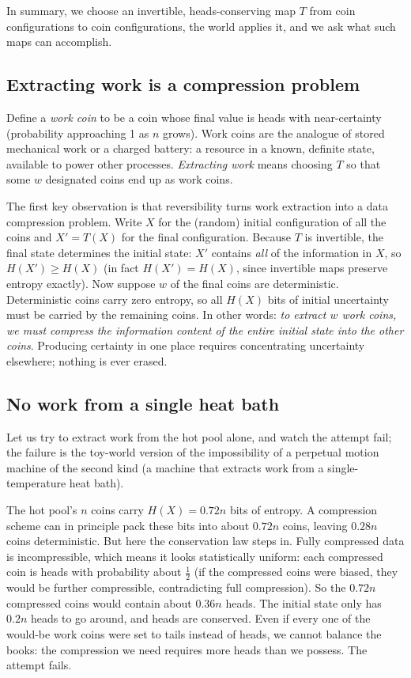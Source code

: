 \documentclass[10pt]{article}
\theoremstyle{definition}
\theoremstyle{remark}
\begin{document}
In summary, we choose an invertible, heads-conserving map $T$ from coin configurations to coin configurations, the world applies it, and we ask what such maps can accomplish.

\subsection{Extracting work is a compression problem}
\label{sec:workcompression}

Define a \emph{work coin} to be a coin whose final value is heads with near-certainty (probability approaching 1 as $n$ grows). Work coins are the analogue of stored mechanical work or a charged battery: a resource in a known, definite state, available to power other processes. \emph{Extracting work} means choosing $T$ so that some $w$ designated coins end up as work coins.

The first key observation is that reversibility turns work extraction into a data compression problem. Write $X$ for the (random) initial configuration of all the coins and $X' = T(X)$ for the final configuration. Because $T$ is invertible, the final state determines the initial state: $X'$ contains \emph{all} of the information in $X$, so $H(X') \ge H(X)$ (in fact $H(X') = H(X)$, since invertible maps preserve entropy exactly). Now suppose $w$ of the final coins are deterministic. Deterministic coins carry zero entropy, so all $H(X)$ bits of initial uncertainty must be carried by the remaining coins. In other words: \emph{to extract $w$ work coins, we must compress the information content of the entire initial state into the other coins}. Producing certainty in one place requires concentrating uncertainty elsewhere; nothing is ever erased.

\subsection{No work from a single heat bath}
\label{sec:onebath}

Let us try to extract work from the hot pool alone, and watch the attempt fail; the failure is the toy-world version of the impossibility of a perpetual motion machine of the second kind (a machine that extracts work from a single-temperature heat bath).

The hot pool's $n$ coins carry $H(X) = 0.72n$ bits of entropy. A compression scheme can in principle pack these bits into about $0.72n$ coins, leaving $0.28n$ coins deterministic. But here the conservation law steps in. Fully compressed data is incompressible, which means it looks statistically uniform: each compressed coin is heads with probability about $\frac12$ (if the compressed coins were biased, they would be further compressible, contradicting full compression). So the $0.72n$ compressed coins would contain about $0.36n$ heads. The initial state only has $0.2n$ heads to go around, and heads are conserved. Even if every one of the would-be work coins were set to tails instead of heads, we cannot balance the books: the compression we need requires more heads than we possess. The attempt fails.
\end{document}
